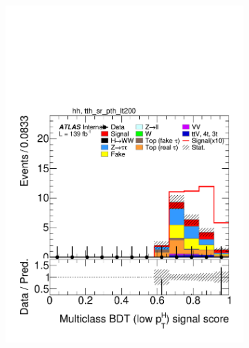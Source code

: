 \begin{figure}[h]
  \centering
  \begin{subfigure}[b]{0.32\textwidth}
    \includegraphics[width=\textwidth]{images/sr_cr_plots/plot_tth_signal_multiclass_lt200_hh_tth_sr_pth_lt200.pdf}
    \caption{}
  \end{subfigure}
  \begin{subfigure}[b]{0.32\textwidth}

\end{subfigure}
\end{figure}

